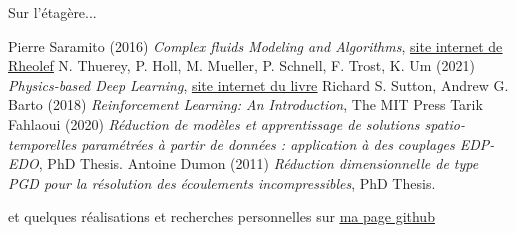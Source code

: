 \documentclass{beamer}
\begin{document}
\begin{frame}{Sur l'étagère...}
\begin{thebibliography}{5}
        Pierre Saramito (2016) \emph{Complex fluids
        Modeling and Algorithms}, \href{https://membres-ljk.imag.fr/Pierre.Saramito/rheolef/html/index.html}{\underline{site internet de Rheolef}}
        N. Thuerey, P. Holl, M. Mueller, P. Schnell, F. Trost, K. Um (2021) \emph{Physics-based Deep Learning}, \href{https://physicsbaseddeeplearning.org/}{\underline{site internet du livre}}
        Richard S. Sutton, Andrew G. Barto (2018) \emph{Reinforcement Learning:
        An Introduction}, The MIT Press
        Tarik Fahlaoui (2020) \emph{Réduction de modèles et apprentissage de solutions
spatio-temporelles paramétrées à partir de données :
application à des couplages EDP-EDO}, PhD Thesis.
    Antoine Dumon (2011) \emph{Réduction dimensionnelle de type PGD pour la résolution des écoulements incompressibles}, PhD Thesis.
\end{thebibliography}
    et quelques réalisations et recherches personnelles sur \href{https://github.com/julienVLNT/python-sandbox/tree/main/machine\%20learning}{\underline{ma page github}}
\end{frame}
\end{document}
